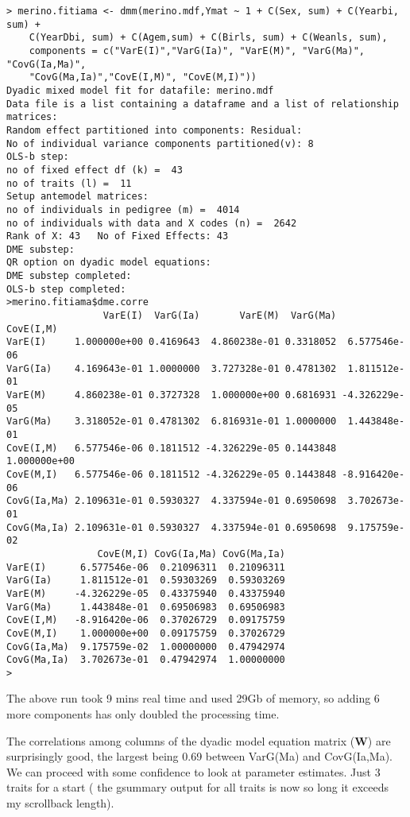 \documentclass[titlepage]{article}  %
\begin{document}
\begin{verbatim}
> merino.fitiama <- dmm(merino.mdf,Ymat ~ 1 + C(Sex, sum) + C(Yearbi, sum) +
    C(YearDbi, sum) + C(Agem,sum) + C(Birls, sum) + C(Weanls, sum),
    components = c("VarE(I)","VarG(Ia)", "VarE(M)", "VarG(Ma)", "CovG(Ia,Ma)",
    "CovG(Ma,Ia)","CovE(I,M)", "CovE(M,I)"))
Dyadic mixed model fit for datafile: merino.mdf  
Data file is a list containing a dataframe and a list of relationship matrices:
Random effect partitioned into components: Residual:
No of individual variance components partitioned(v): 8 
OLS-b step:
no of fixed effect df (k) =  43 
no of traits (l) =  11 
Setup antemodel matrices:
no of individuals in pedigree (m) =  4014 
no of individuals with data and X codes (n) =  2642 
Rank of X: 43   No of Fixed Effects: 43 
DME substep:
QR option on dyadic model equations:
DME substep completed:
OLS-b step completed:
>merino.fitiama$dme.corre
                 VarE(I)  VarG(Ia)       VarE(M)  VarG(Ma)     CovE(I,M)
VarE(I)     1.000000e+00 0.4169643  4.860238e-01 0.3318052  6.577546e-06
VarG(Ia)    4.169643e-01 1.0000000  3.727328e-01 0.4781302  1.811512e-01
VarE(M)     4.860238e-01 0.3727328  1.000000e+00 0.6816931 -4.326229e-05
VarG(Ma)    3.318052e-01 0.4781302  6.816931e-01 1.0000000  1.443848e-01
CovE(I,M)   6.577546e-06 0.1811512 -4.326229e-05 0.1443848  1.000000e+00
CovE(M,I)   6.577546e-06 0.1811512 -4.326229e-05 0.1443848 -8.916420e-06
CovG(Ia,Ma) 2.109631e-01 0.5930327  4.337594e-01 0.6950698  3.702673e-01
CovG(Ma,Ia) 2.109631e-01 0.5930327  4.337594e-01 0.6950698  9.175759e-02
                CovE(M,I) CovG(Ia,Ma) CovG(Ma,Ia)
VarE(I)      6.577546e-06  0.21096311  0.21096311
VarG(Ia)     1.811512e-01  0.59303269  0.59303269
VarE(M)     -4.326229e-05  0.43375940  0.43375940
VarG(Ma)     1.443848e-01  0.69506983  0.69506983
CovE(I,M)   -8.916420e-06  0.37026729  0.09175759
CovE(M,I)    1.000000e+00  0.09175759  0.37026729
CovG(Ia,Ma)  9.175759e-02  1.00000000  0.47942974
CovG(Ma,Ia)  3.702673e-01  0.47942974  1.00000000
> 
\end{verbatim}

The above run took 9 mins real time and used 29Gb of memory, so adding 6 more components has only doubled the processing time.

The correlations among columns of the dyadic model equation matrix (${\bm W}$) are surprisingly good, the largest being 0.69 between VarG(Ma) and CovG(Ia,Ma). We can proceed with some confidence to look at parameter estimates. Just 3 traits for a start ( the gsummary output for all traits is now so long it exceeds my scrollback length).
\end{document}
